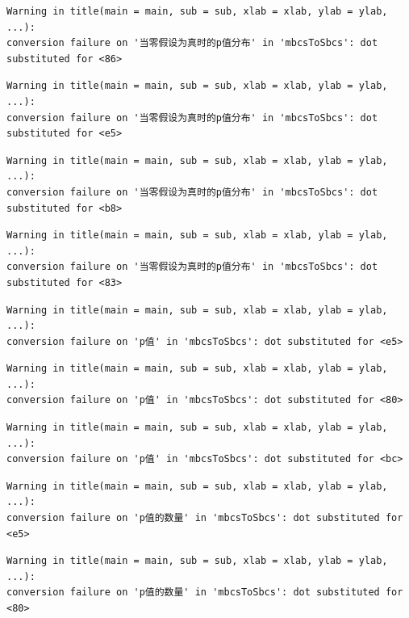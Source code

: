 \documentclass[
  letterpaper,
  DIV=11,
  numbers=noendperiod]{scrreprt}
\begin{document}
\begin{verbatim}
Warning in title(main = main, sub = sub, xlab = xlab, ylab = ylab, ...):
conversion failure on '当零假设为真时的p值分布' in 'mbcsToSbcs': dot
substituted for <86>
\end{verbatim}

\begin{verbatim}
Warning in title(main = main, sub = sub, xlab = xlab, ylab = ylab, ...):
conversion failure on '当零假设为真时的p值分布' in 'mbcsToSbcs': dot
substituted for <e5>
\end{verbatim}

\begin{verbatim}
Warning in title(main = main, sub = sub, xlab = xlab, ylab = ylab, ...):
conversion failure on '当零假设为真时的p值分布' in 'mbcsToSbcs': dot
substituted for <b8>
\end{verbatim}

\begin{verbatim}
Warning in title(main = main, sub = sub, xlab = xlab, ylab = ylab, ...):
conversion failure on '当零假设为真时的p值分布' in 'mbcsToSbcs': dot
substituted for <83>
\end{verbatim}

\begin{verbatim}
Warning in title(main = main, sub = sub, xlab = xlab, ylab = ylab, ...):
conversion failure on 'p值' in 'mbcsToSbcs': dot substituted for <e5>
\end{verbatim}

\begin{verbatim}
Warning in title(main = main, sub = sub, xlab = xlab, ylab = ylab, ...):
conversion failure on 'p值' in 'mbcsToSbcs': dot substituted for <80>
\end{verbatim}

\begin{verbatim}
Warning in title(main = main, sub = sub, xlab = xlab, ylab = ylab, ...):
conversion failure on 'p值' in 'mbcsToSbcs': dot substituted for <bc>
\end{verbatim}

\begin{verbatim}
Warning in title(main = main, sub = sub, xlab = xlab, ylab = ylab, ...):
conversion failure on 'p值的数量' in 'mbcsToSbcs': dot substituted for <e5>
\end{verbatim}

\begin{verbatim}
Warning in title(main = main, sub = sub, xlab = xlab, ylab = ylab, ...):
conversion failure on 'p值的数量' in 'mbcsToSbcs': dot substituted for <80>
\end{verbatim}
\end{document}
